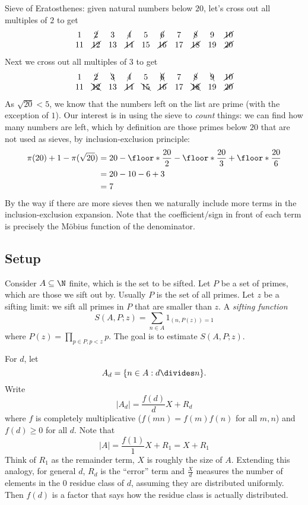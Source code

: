 \documentclass[a4paper]{article}
\theoremstyle{definition}
\begin{document}
Sieve of Eratosthenes: given natural numbers below \(20\), let's cross out all multiples of \(2\) to get
\[
  \begin{array}{cccccccccc}
    1 & \cancel 2 & 3 & \cancel 4 & 5 & \cancel 6 & 7 & \cancel 8 & 9 & \cancel{10} \\
    11 & \cancel{12} & 13 & \cancel{14} & 15 & \cancel{16} & 17 & \cancel{18} & 19 & \cancel{20}
  \end{array}
\]
Next we cross out all multiples of \(3\) to get
\[
  \begin{array}{cccccccccc}
    1 & \cancel 2 & \bcancel 3 & \cancel 4 & 5 & \xcancel 6 & 7 & \cancel 8 & \bcancel 9 & \cancel{10} \\
    11 & \xcancel{12} & 13 & \cancel{14} & \bcancel{15} & \cancel{16} & 17 & \xcancel{18} & 19 & \cancel{20}
  \end{array}
\]
As \(\sqrt{20} < 5\), we know that the numbers left on the list are prime (with the exception of \(1\)). Our interest is in using the sieve to \emph{count} things: we can find how many numbers are left, which by definition are those primes below \(20\) that are not used as sieves, by inclusion-exclusion principle:
\begin{align*}
  \pi(20) + 1 - \pi(\sqrt{20})
  &= 20 - \floor*{\frac{20}{2}} - \floor*{\frac{20}{3}} + \floor*{\frac{20}{6}} \\
  &= 20 - 10 - 6 + 3 \\
  &= 7
\end{align*}
By the way if there are more sieves then we naturally include more terms in the inclusion-exclusion expansion. Note that the coefficient/sign in front of each term is precisely the Möbius function of the denominator.

\subsection{Setup}

Consider \(A \subseteq \N\) finite, which is the set to be sifted. Let \(P\) be a set of primes, which are those we sift out by. Usually \(P\) is the set of all primes. Let \(z\) be a sifting limit: we sift all primes in \(P\) that are smaller than \(z\). A \emph{sifting function}
\[
  S(A, P; z) = \sum_{n \in A} 1_{(n, P(z)) = 1}
\]
where \(P(z) = \prod_{p \in P, p < z} p\). The goal is to estimate \(S(A, P; z)\).

For \(d\), let
\[
  A_d = \{n \in A: d \divides n\}.
\]
Write
\[
  |A_d| = \frac{f(d)}{d} X + R_d
\]
where \(f\) is completely multiplicative (\(f(mn) = f(m)f(n)\) for all \(m, n\)) and \(f(d) \geq 0\) for all \(d\). Note that
\[
  |A| = \frac{f(1)}{1} X + R_1 = X + R_1
\]
Think of \(R_1\) as the remainder term, \(X\) is roughly the size of \(A\). Extending this analogy, for general \(d\), \(R_d\) is the ``error'' term and \(\frac{X}{d}\) measures the number of elements in the \(0\) residue class of \(d\), assuming they are distributed uniformly. Then \(f(d)\) is a factor that says how the residue class is actually distributed.
\end{document}
